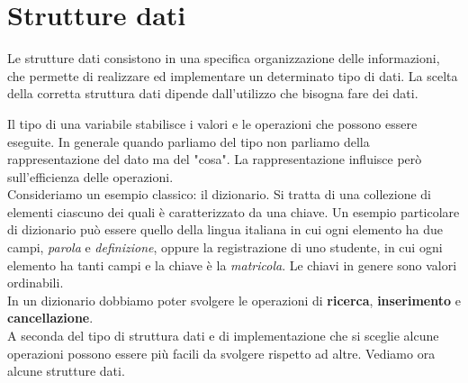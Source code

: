 \section{Strutture dati}
Le strutture dati consistono in una specifica organizzazione delle informazioni,
che permette di realizzare ed implementare un determinato tipo di dati.
La scelta della corretta struttura dati dipende dall'utilizzo che bisogna fare 
dei dati.

Il tipo di una variabile stabilisce i valori e le operazioni che possono essere
eseguite. In generale quando parliamo del tipo non parliamo della rappresentazione
del dato ma del "cosa". La rappresentazione influisce però sull'efficienza delle
operazioni.\\
Consideriamo un esempio classico: il dizionario. Si tratta di una collezione di elementi
ciascuno dei quali è caratterizzato da una chiave. Un esempio particolare di dizionario
può essere quello della lingua italiana in cui ogni elemento ha due campi, {\emph{parola}} e {\emph{definizione}},
oppure la registrazione di uno studente, in cui ogni elemento ha tanti campi e la chiave
è la {\emph{matricola}}.
Le chiavi in genere sono valori ordinabili.\\
In un dizionario dobbiamo poter svolgere le operazioni di {\textbf{ricerca}},
{\textbf{inserimento}} e {\textbf{cancellazione}}. \\
A seconda del tipo di struttura dati e di implementazione che si sceglie alcune operazioni possono essere più facili
da svolgere rispetto ad altre.
Vediamo ora alcune strutture dati.
\clearpage
